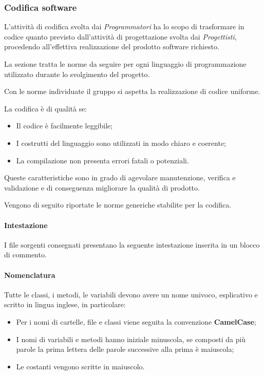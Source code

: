 \subsubsection{Codifica software}
L'attività di codifica svolta dai \textit{Programmatori} ha lo scopo di trasformare in codice quanto previsto dall'attività di progettazione svolta dai \textit{Progettisti}, procedendo all'effettiva realizzazione del prodotto software richiesto.

La sezione tratta le norme da seguire per ogni linguaggio di programmazione utilizzato durante lo svolgimento del progetto.

Con le norme individuate il gruppo si aspetta la realizzazione di codice uniforme.

La codifica è di qualità se: 
\begin{itemize}
	\item Il codice è facilmente leggibile;
	\item I costrutti del linguaggio sono utilizzati in modo chiaro e coerente;
	\item La compilazione non presenta errori fatali o potenziali.
\end{itemize}
Queste caratteristiche sono in grado di agevolare manutenzione, verifica e validazione e di conseguenza migliorare la qualità di prodotto.

\label{CodificaConvenzioni}
Vengono di seguito riportate le norme generiche stabilite per la codifica.
\paragraph*{Intestazione}
I file sorgenti consegnati presentano la seguente intestazione inserita in un blocco di commento.
\paragraph*{Nomenclatura}
Tutte le classi, i metodi, le variabili devono avere un nome univoco, esplicativo e scritto in lingua inglese, in particolare:
\begin{itemize}
	\item Per i nomi di cartelle, file e classi viene seguita la convenzione \textbf{CamelCase};
	\item I nomi di variabili e metodi hanno iniziale minuscola, se composti da più parole la prima lettera delle parole successive alla prima è maiuscola;
	\item Le costanti vengono scritte in maiuscolo.
\end{itemize}
